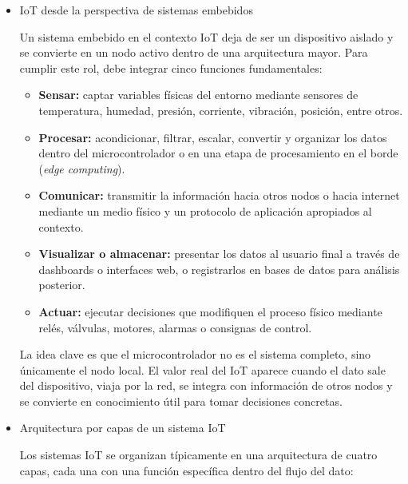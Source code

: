 \begin{itemize}
\begin{itemize}
            En la \textbf{Industria 4.0}, el dato deja de ser solo un registro histórico y se convierte en base para analítica avanzada, interoperabilidad entre sistemas heterogéneos, decisión en tiempo real y automatización inteligente apoyada en inteligencia artificial y gemelos digitales.

            \item IoT desde la perspectiva de sistemas embebidos

            Un sistema embebido en el contexto IoT deja de ser un dispositivo aislado y se convierte en un nodo activo dentro de una arquitectura mayor. Para cumplir este rol, debe integrar cinco funciones fundamentales:

                \begin{itemize}
                    \item \textbf{Sensar:} captar variables físicas del entorno mediante sensores de temperatura, humedad, presión, corriente, vibración, posición, entre otros.
                    \item \textbf{Procesar:} acondicionar, filtrar, escalar, convertir y organizar los datos dentro del microcontrolador o en una etapa de procesamiento en el borde (\textit{edge computing}).
                    \item \textbf{Comunicar:} transmitir la información hacia otros nodos o hacia internet mediante un medio físico y un protocolo de aplicación apropiados al contexto.
                    \item \textbf{Visualizar o almacenar:} presentar los datos al usuario final a través de dashboards o interfaces web, o registrarlos en bases de datos para análisis posterior.
                    \item \textbf{Actuar:} ejecutar decisiones que modifiquen el proceso físico mediante relés, válvulas, motores, alarmas o consignas de control.
                \end{itemize}

            La idea clave es que el microcontrolador no es el sistema completo, sino únicamente el nodo local. El valor real del IoT aparece cuando el dato sale del dispositivo, viaja por la red, se integra con información de otros nodos y se convierte en conocimiento útil para tomar decisiones concretas.

            \item Arquitectura por capas de un sistema IoT

            Los sistemas IoT se organizan típicamente en una arquitectura de cuatro capas, cada una con una función específica dentro del flujo del dato:


\end{itemize}
\end{itemize}
